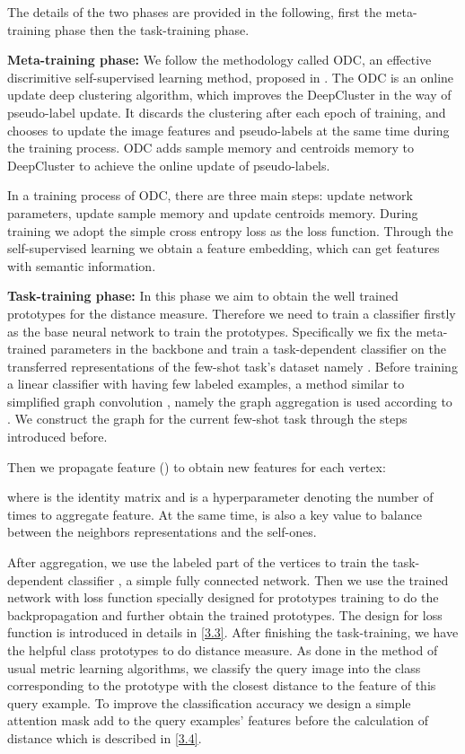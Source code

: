 \documentclass[conference]{IEEEtran}
\begin{document}
The details of the two phases are provided in the following, ﬁrst the meta-training phase then the task-training phase.


\textbf{Meta-training phase:} We follow the methodology called ODC, an effective discrimitive self-supervised learning method, proposed in \cite{zhan2020online}. The ODC is an online update deep clustering algorithm, which improves the DeepCluster \cite{tian2017deepcluster} in the way of pseudo-label update. It discards the clustering after each epoch of training, and chooses to update the image features and pseudo-labels at the same time during the training process. ODC adds sample memory and centroids memory to DeepCluster to achieve the online update of pseudo-labels.

In a training process of ODC, there are three main steps: update network parameters, update sample memory and update centroids memory. During training we adopt the simple cross entropy loss as the loss function. Through the self-supervised learning we obtain a feature embedding, which can get features with semantic information. 


\textbf{Task-training phase:} In this phase we aim to obtain the well trained prototypes for the distance measure. Therefore we need to train a classifier firstly as the base neural network to train the prototypes. Specifically we ﬁx the meta-trained parameters in the backbone and train a task-dependent classiﬁer  on the transferred representations of the few-shot task’s dataset namely . Before training a linear classiﬁer with  having few labeled examples, a method similar to simpliﬁed graph convolution \cite{wu2019simplifying}, namely the graph aggregation is used according to \cite{li2020few}. We construct the graph  for the current few-shot task through the steps introduced before.

Then we propagate feature (\cite{wu2019simplifying}) to obtain new features for each vertex:

where  is the identity matrix and  is a hyperparameter  denoting the number of times to aggregate feature. At the same time,  is also a key value to balance between the neighbors representations and the self-ones.


After aggregation, we use the labeled part of the vertices to train the task-dependent classifier , a simple fully connected network. Then we use the trained network   with loss function specially designed for prototypes training to do the backpropagation and further obtain the trained prototypes. The design for loss function is introduced in details in \ref{3.3}. After finishing the task-training, we have the helpful class prototypes to do distance measure. As done in the method of usual metric learning algorithms, we classify the query image into the class corresponding to the prototype with the closest distance to the feature of this query example. To improve the classification accuracy we design a simple attention mask add to the query examples' features before the calculation of distance which is described in \ref{3.4}.
       
\end{document}
